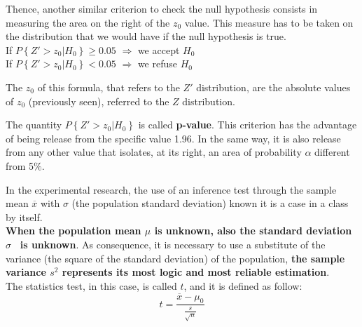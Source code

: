 \begin{frame}
  Thence, another similar criterion to check the null hypothesis consists in measuring the area on the right of the $ z_0 $ value. This measure has to be taken on the distribution that we would have if the null hypothesis is true.\\
  \vspace*{.2cm}
  If $ P \left\{ Z' > z_0 \lvert H_0 \right\} \geq 0.05 $ $\Rightarrow $ we accept $ H_0 $\\
  \vspace*{.1cm}
  If $ P  \left\{ Z' > z_0 \lvert H_0 \right\} < 0.05 $ $\Rightarrow $ we refuse $ H_0 $\\
  \vspace*{.2cm}
  \begin{footnotesize}
    The $ z_0 $ of this formula, that refers to the $ Z' $ distribution, are the absolute values of $ z_0 $ (previously seen), referred to the $ Z $ distribution.\\
  \end{footnotesize}
  \vspace*{.5cm}
  The quantity $ P \left\{ Z'>z_0 \lvert H_0 \right\} $ is called \textbf{p-value}.
  This criterion has the advantage of being release from the specific value 1.96. In the same way, it is also release from any other value that isolates, at its right, an area of probability $\alpha$ different from 5$ \% $.
\end{frame}




\begin{frame}
  \vspace*{.25cm}
  In the experimental  research, the use of an inference test through the sample mean {\boldmath $ \overline{x} $} with {\boldmath $ \sigma $} (the population standard deviation) known  it is a case in a class by itself.\\
  \vspace*{.25cm}
  \textbf{When the population mean {\boldmath $ \mu $} is unknown, also the standard deviation \textbf{\boldmath $ \sigma $}} \textbf{\ is unknown}. As consequence, it is necessary to use a substitute of the variance (the square of the standard deviation) of the population, \textbf{the sample variance {\boldmath $ s^2 $} represents its most logic and most reliable estimation}.\\
  \vspace*{.25cm}
  The statistics test, in this case, is called $ t $, and it is defined as follow:\\
  $$ t = \frac{\overline{x} - \mu_0}{\frac{s}{\sqrt{n}}} $$
\end{frame}

